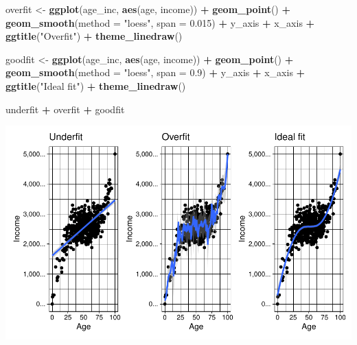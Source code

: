 \documentclass[
]{book}
\newenvironment{Shaded}{\begin{snugshade}}{\end{snugshade}}
\newcommand{\DataTypeTok}[1]{\textcolor[rgb]{0.13,0.29,0.53}{#1}}
\newcommand{\FloatTok}[1]{\textcolor[rgb]{0.00,0.00,0.81}{#1}}
\newcommand{\KeywordTok}[1]{\textcolor[rgb]{0.13,0.29,0.53}{\textbf{#1}}}
\newcommand{\NormalTok}[1]{#1}
\newcommand{\OperatorTok}[1]{\textcolor[rgb]{0.81,0.36,0.00}{\textbf{#1}}}
\newcommand{\StringTok}[1]{\textcolor[rgb]{0.31,0.60,0.02}{#1}}
\begin{document}
\begin{Shaded}
\begin{Highlighting}[]
\NormalTok{overfit <-}
\StringTok{  }\KeywordTok{ggplot}\NormalTok{(age_inc, }\KeywordTok{aes}\NormalTok{(age, income)) }\OperatorTok{+}
\StringTok{  }\KeywordTok{geom_point}\NormalTok{() }\OperatorTok{+}
\StringTok{  }\KeywordTok{geom_smooth}\NormalTok{(}\DataTypeTok{method =} \StringTok{"loess"}\NormalTok{, }\DataTypeTok{span =} \FloatTok{0.015}\NormalTok{) }\OperatorTok{+}
\StringTok{  }\NormalTok{y_axis }\OperatorTok{+}
\StringTok{  }\NormalTok{x_axis }\OperatorTok{+}\StringTok{  }
\StringTok{  }\KeywordTok{ggtitle}\NormalTok{(}\StringTok{"Overfit"}\NormalTok{) }\OperatorTok{+}
\StringTok{  }\KeywordTok{theme_linedraw}\NormalTok{()}

\NormalTok{goodfit <-}
\StringTok{  }\KeywordTok{ggplot}\NormalTok{(age_inc, }\KeywordTok{aes}\NormalTok{(age, income)) }\OperatorTok{+}
\StringTok{  }\KeywordTok{geom_point}\NormalTok{() }\OperatorTok{+}
\StringTok{  }\KeywordTok{geom_smooth}\NormalTok{(}\DataTypeTok{method =} \StringTok{"loess"}\NormalTok{, }\DataTypeTok{span =} \FloatTok{0.9}\NormalTok{) }\OperatorTok{+}
\StringTok{  }\NormalTok{y_axis }\OperatorTok{+}
\StringTok{  }\NormalTok{x_axis }\OperatorTok{+}\StringTok{  }
\StringTok{  }\KeywordTok{ggtitle}\NormalTok{(}\StringTok{"Ideal fit"}\NormalTok{) }\OperatorTok{+}
\StringTok{  }\KeywordTok{theme_linedraw}\NormalTok{()}

\NormalTok{underfit }\OperatorTok{+}\StringTok{ }\NormalTok{overfit }\OperatorTok{+}\StringTok{ }\NormalTok{goodfit}
\end{Highlighting}
\end{Shaded}

\begin{center}\includegraphics[width=0.99\linewidth]{./figs/unnamed-chunk-4-1} \end{center}
\end{document}

